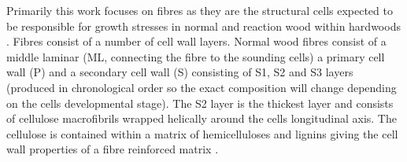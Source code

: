 Primarily this work focuses on fibres as they are the structural cells expected
to be responsible for growth stresses in normal and reaction wood within
hardwoods \cite{archer1987growth}. Fibres consist of a number of cell wall layers. Normal wood fibres
consist of a middle laminar (ML, connecting the fibre to
the sounding cells) a primary cell wall (P) and a secondary cell wall (S) consisting of
S1, S2 and S3 layers (produced in chronological order so the exact composition
will change depending on the cells developmental stage)\cite{barnett1981xylem}. The S2 layer is
the thickest layer and consists of cellulose macrofibrils wrapped helically
around the cells longitudinal axis. The cellulose is contained within a
matrix of hemicelluloses and lignins giving the cell wall properties
of a fibre reinforced matrix \cite{niklas2012plant}.